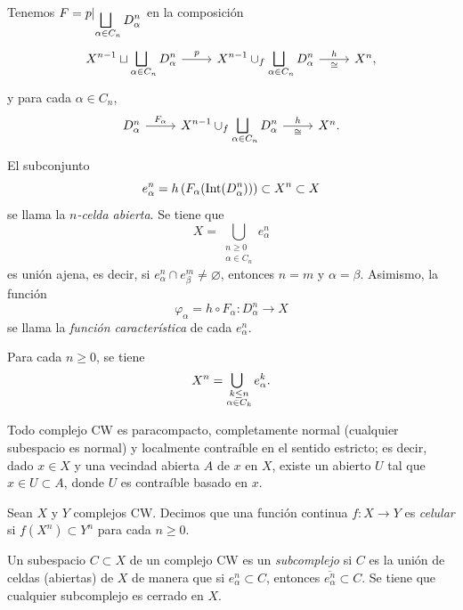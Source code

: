 \begin{definicion}
Tenemos $F = p|_{\displaystyle\medsqcup_{\alpha \in C_n} D_\alpha^n}$ en la composición
\[
\begin{tikzcd}
\displaystyle X^{n-1} \sqcup \medsqcup_{\alpha \in C_n} D_\alpha^n \arrow[r, "p"] &\displaystyle X^{n-1} \cup_f \medsqcup_{\alpha \in C_n} D_\alpha^n \arrow[r, "h", "\cong"'] & X^n,
\end{tikzcd}
\]
y para cada $\alpha \in C_n$,
\[
\begin{tikzcd}
D_\alpha^n \arrow[r, "F_\alpha"] &\displaystyle X^{n-1} \cup_f \medsqcup_{\alpha \in C_n} D_\alpha^n \arrow[r, "h", "\cong"'] & X^n.
\end{tikzcd}
\]
El subconjunto
\[
e_\alpha^n = h\left(F_\alpha(\mathrm{Int}(D_\alpha^n))\right) \subset X^n \subset X
\]
se llama la \textit{$n$-celda abierta}. Se tiene que
\[
X = \bigcup_{\substack{n \geq 0 \\ \alpha \in C_n}} e_\alpha^n
\]
es unión ajena, es decir, si $e_\alpha^n \cap e_\beta^m \neq \varnothing$, entonces $n = m$ y $\alpha = \beta$. Asimismo, la función
\[
\varphi_\alpha = h \circ F_\alpha \colon D_\alpha^n \longrightarrow X
\]
se llama la \textit{función característica} de cada $e_\alpha^n$.
\end{definicion}

\begin{nota}
Para cada $n \geq 0$, se tiene 
$$X^n = \medcup_{\substack{k \leq n \\ \alpha \in C_k}} e_\alpha^k.$$ 
\end{nota}
\begin{nota}
Todo complejo CW es paracompacto, completamente normal (cualquier subespacio es normal) y localmente contraíble en el sentido estricto; es decir, dado $x \in X$ y una vecindad abierta $A$ de $x$ en $X$, existe un abierto $U$ tal que $x \in U \subset A$, donde $U$ es contraíble basado en $x$.
\end{nota}

\begin{definicion}
Sean $X$ y $Y$ complejos CW. Decimos que una función continua $f \colon X \to Y$ es \textit{celular} si $f(X^n) \subset Y^n$ para cada $n \geq 0$.
\end{definicion}

\begin{definicion}
Un subespacio $C \subset X$ de un complejo CW es un \textit{subcomplejo} si $C$ es la unión de celdas (abiertas) de $X$ de manera que si $e_\alpha^n \subset C$, entonces $\overline{e_\alpha^n} \subset C$. Se tiene que cualquier subcomplejo es cerrado en $X$.
\end{definicion}

